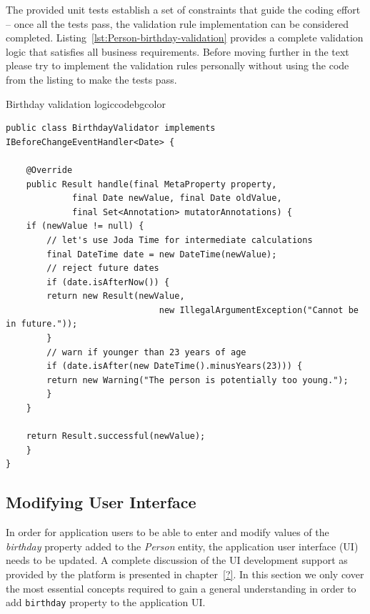   The provided unit tests establish a set of constraints that guide the coding effort -- once all the tests pass, the validation rule implementation can be considered completed.
  Listing~\ref{lst:Person-birthday-validation} provides a complete validation logic that satisfies all business requirements.
  Before moving further in the text please try to implement the validation rules personally without using the code from the listing to make the tests pass.


 \begin{code}{Birthday validation logic}{\label{lst:Person-birthday-validation}}{codebgcolor}
    \begin{lstlisting}
public class BirthdayValidator implements IBeforeChangeEventHandler<Date> {

    @Override
    public Result handle(final MetaProperty property, 
			 final Date newValue, final Date oldValue, 
			 final Set<Annotation> mutatorAnnotations) {
	if (newValue != null) {
	    // let's use Joda Time for intermediate calculations
	    final DateTime date = new DateTime(newValue);
	    // reject future dates 
	    if (date.isAfterNow()) {
		return new Result(newValue, 
	                          new IllegalArgumentException("Cannot be in future."));
	    }
	    // warn if younger than 23 years of age 
	    if (date.isAfter(new DateTime().minusYears(23))) {
		return new Warning("The person is potentially too young.");
	    }
	}	
	
	return Result.successful(newValue);
    }
}
    \end{lstlisting}
  \end{code}

\subsection{Modifying User Interface}
  In order for application users to be able to enter and modify values of the \emph{birthday} property added to the \emph{Person} entity, the application user interface (UI) needs to be updated.
  A complete discussion of the UI development support as provided by the platform is presented in chapter~\ref{?}.
  In this section we only cover the most essential concepts required to gain a general understanding in order to add \texttt{birthday} property to the application UI.

